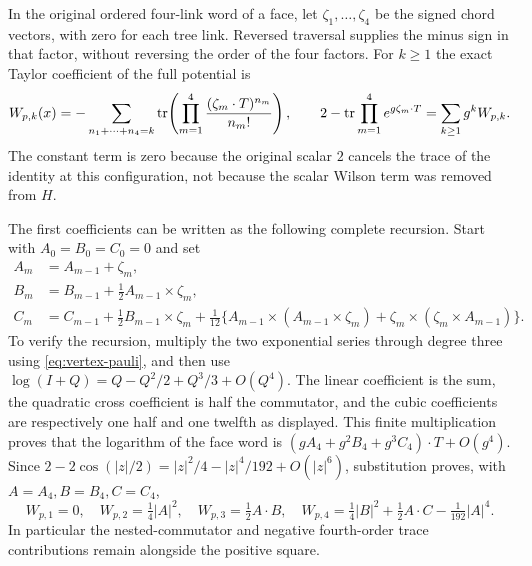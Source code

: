 In the original ordered four-link word of a face, let
$\zeta_1,\ldots,\zeta_4$ be the signed chord vectors, with zero
for each tree link. Reversed traversal supplies the minus sign in
that factor, without reversing the order of the four factors.
For $k\ge1$ the exact Taylor coefficient of the full potential is
\begin{equation}\label{eq:vertex-Wk}
 W_{p,k}(x)=-\sum_{n_1+\cdots+n_4=k}
       \operatorname{tr}\!\left(\prod_{m=1}^4
                   \frac{(\zeta_m\cdot T)^{n_m}}{n_m!}\right),
 \qquad 2-\operatorname{tr}\prod_{m=1}^4 e^{g\zeta_m\cdot T}
           =\sum_{k\ge1}g^kW_{p,k}.
\end{equation}
The constant term is zero because the original scalar $2$ cancels
the trace of the identity at this configuration, not because the
scalar Wilson term was removed from $H$.

The first coefficients can be written as the following complete
recursion. Start with $A_0=B_0=C_0=0$ and set
\begin{align}
 A_m&=A_{m-1}+\zeta_m,\nonumber\\
 B_m&=B_{m-1}+\tfrac12 A_{m-1}\times\zeta_m,\nonumber\\
 C_m&=C_{m-1}+\tfrac12 B_{m-1}\times\zeta_m
   +\tfrac1{12}\{A_{m-1}\times(A_{m-1}\times\zeta_m)
          +\zeta_m\times(\zeta_m\times A_{m-1})\}.
       \label{eq:vertex-BCH}
\end{align}
To verify the recursion, multiply the two exponential series through
degree three using \eqref{eq:vertex-pauli}, and then use
$\log(I+Q)=Q-Q^2/2+Q^3/3+O(Q^4)$. The linear coefficient is the
sum, the quadratic cross coefficient is half the commutator, and
the cubic coefficients are respectively one half and one twelfth
as displayed. This finite multiplication proves that the logarithm
of the face word is $(gA_4+g^2B_4+g^3C_4)\cdot T+O(g^4)$.
Since $2-2\cos(|z|/2)=|z|^2/4-|z|^4/192+O(|z|^6)$, substitution
proves, with $A=A_4,B=B_4,C=C_4$,
\begin{equation}\label{eq:vertex-W234}
 W_{p,1}=0,\quad W_{p,2}=\tfrac14|A|^2,\quad
 W_{p,3}=\tfrac12 A\cdot B,\quad
 W_{p,4}=\tfrac14|B|^2+\tfrac12 A\cdot C-\tfrac1{192}|A|^4.
\end{equation}
In particular the nested-commutator and negative fourth-order
trace contributions remain alongside the positive square.

